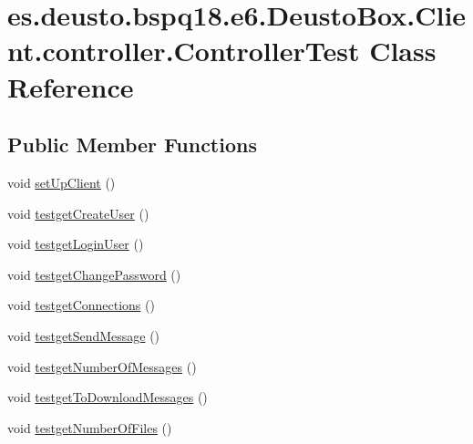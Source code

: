 \hypertarget{classes_1_1deusto_1_1bspq18_1_1e6_1_1_deusto_box_1_1_client_1_1controller_1_1_controller_test}{}\section{es.\+deusto.\+bspq18.\+e6.\+Deusto\+Box.\+Client.\+controller.\+Controller\+Test Class Reference}
\label{classes_1_1deusto_1_1bspq18_1_1e6_1_1_deusto_box_1_1_client_1_1controller_1_1_controller_test}
\subsection*{Public Member Functions}
\begin{DoxyCompactItemize}
\item 
void \mbox{\hyperlink{classes_1_1deusto_1_1bspq18_1_1e6_1_1_deusto_box_1_1_client_1_1controller_1_1_controller_test_ab4dc8efd778dfe01671091acfa8af10f}{set\+Up\+Client}} ()
\item 
void \mbox{\hyperlink{classes_1_1deusto_1_1bspq18_1_1e6_1_1_deusto_box_1_1_client_1_1controller_1_1_controller_test_a0301da090b3ee8b1c2ac7b12a4c5b40e}{testget\+Create\+User}} ()
\item 
void \mbox{\hyperlink{classes_1_1deusto_1_1bspq18_1_1e6_1_1_deusto_box_1_1_client_1_1controller_1_1_controller_test_acf173ddd16b594805c11d836ecb74ae5}{testget\+Login\+User}} ()
\item 
void \mbox{\hyperlink{classes_1_1deusto_1_1bspq18_1_1e6_1_1_deusto_box_1_1_client_1_1controller_1_1_controller_test_a145089ef38132ee3109ff395d7cc46e3}{testget\+Change\+Password}} ()
\item 
void \mbox{\hyperlink{classes_1_1deusto_1_1bspq18_1_1e6_1_1_deusto_box_1_1_client_1_1controller_1_1_controller_test_a3b0bc89fe1e1bb8c421d7f156b54b8af}{testget\+Connections}} ()
\item 
void \mbox{\hyperlink{classes_1_1deusto_1_1bspq18_1_1e6_1_1_deusto_box_1_1_client_1_1controller_1_1_controller_test_af4cc91fd34cf5bef59e29af4fd6b3972}{testget\+Send\+Message}} ()
\item 
void \mbox{\hyperlink{classes_1_1deusto_1_1bspq18_1_1e6_1_1_deusto_box_1_1_client_1_1controller_1_1_controller_test_a9cd3a575355e5c1d8b34e45bbfc7ab3f}{testget\+Number\+Of\+Messages}} ()
\item 
void \mbox{\hyperlink{classes_1_1deusto_1_1bspq18_1_1e6_1_1_deusto_box_1_1_client_1_1controller_1_1_controller_test_a91f717ecb0c8b90daf6a43db0dd0bcbf}{testget\+To\+Download\+Messages}} ()
\item 
void \mbox{\hyperlink{classes_1_1deusto_1_1bspq18_1_1e6_1_1_deusto_box_1_1_client_1_1controller_1_1_controller_test_a340eca6755e72bdc0f5c5a78e8aad497}{testget\+Number\+Of\+Files}} ()
\end{DoxyCompactItemize}
